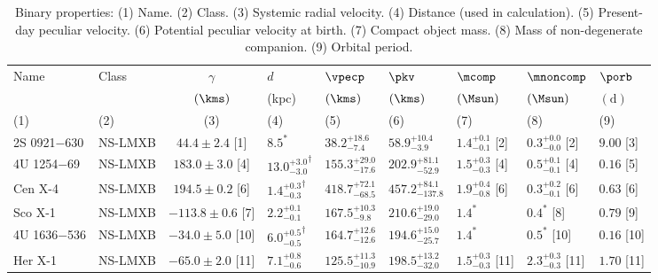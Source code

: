 \begin{table*}
  \centering
  \caption{Binary properties: (1) Name. (2) Class. (3) Systemic radial velocity. (4) Distance (used in calculation). (5) Present-day peculiar velocity. (6) Potential peculiar velocity at birth. (7) Compact object mass. (8) Mass of non-degenerate companion. (9) Orbital period. }
  \begin{adjustbox}{width=0.98\textwidth}
  \begin{threeparttable}
      \begin{tabular}{llcllllll}
          \toprule
          Name & Class & $\gamma$ & $d$   & $\vpecp$ &  $\pkv$     & $\mcomp$ & $\mnoncomp$ & $\porb$ \\
               &       & $(\kms)$ & (kpc) & $(\kms)$ & $(\kms)$ & $(\Msun)$  & $(\Msun)$ & $(\mathrm{d})$  \\
          (1)  & (2)   & (3)      & (4)   & (5)      & (6)  & (7) & (8) & (9) \\
          \midrule
      2S 0921$-$630        & NS-LMXB  & $  44.4\pm  2.4$ [1]   & $8.5^\ast$                  & $38.2^{+18.6}_{-7.4}$     & $58.9^{+10.4}_{-3.9}$     & $1.4^{+0.1}_{-0.1}$ [2]   & $0.3^{+0.0}_{-0.0}$ [2]      & $9.00$ [3]   \\
      4U 1254$-$69         & NS-LMXB  & $ 183.0\pm  3.0$ [4]   & ${13.0^{+3.0}_{-3.0}}^\dag$ & $155.3^{+29.0}_{-17.6}$   & $202.9^{+81.1}_{-52.9}$   & $1.5^{+0.3}_{-0.3}$ [4]   & $0.5^{+0.1}_{-0.1}$ [4]      & $0.16$ [5]   \\
      Cen X-4              & NS-LMXB  & $ 194.5\pm  0.2$ [6]   & ${1.4^{+0.3}_{-0.3}}^\dag$  & $418.7^{+72.1}_{-68.5}$   & $457.2^{+84.1}_{-137.8}$  & $1.9^{+0.4}_{-0.8}$ [6]   & $0.3^{+0.2}_{-0.1}$ [6]      & $0.63$ [6]   \\
      Sco X-1              & NS-LMXB  & $-113.8\pm  0.6$ [7]   & $2.2^{+0.1}_{-0.1}$         & $167.5^{+10.3}_{-9.8}$    & $210.6^{+19.0}_{-29.0}$   & $1.4^\ast$                & $0.4^\ast$ [8]               & $0.79$ [9]   \\
      4U 1636$-$536        & NS-LMXB  & $ -34.0\pm  5.0$ [10]  & ${6.0^{+0.5}_{-0.5}}^\dag$  & $164.7^{+12.6}_{-12.6}$   & $194.6^{+15.0}_{-25.7}$   & $1.4^\ast$                & $0.5^\ast$ [10]              & $0.16$ [10]  \\
      Her X-1              & NS-LMXB  & $ -65.0\pm  2.0$ [11]  & $7.1^{+0.8}_{-0.6}$         & $125.5^{+11.3}_{-10.9}$   & $198.5^{+13.2}_{-32.0}$   & $1.5^{+0.3}_{-0.3}$ [11]  & $2.3^{+0.3}_{-0.3}$ [11]     & $1.70$ [11]  \\

\end{tabular}
\end{threeparttable}
\end{adjustbox}
\end{table*}
